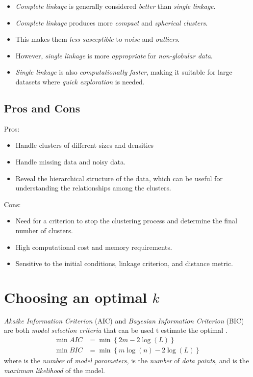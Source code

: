 \documentclass[
	number={6},
	title={Clustering}
]{cs584notes}
\begin{document}
\begin{itemize}
	\item \emph{Complete linkage} is generally considered \emph{better} than \emph{single linkage}.
	\item \emph{Complete linkage} produces more \emph{compact} and \emph{spherical clusters}.
	\item This makes them \emph{less susceptible} to \emph{noise} and \emph{outliers}.
	\item However, \emph{single linkage} is more \emph{appropriate} for \emph{non-globular data}.
	\item \emph{Single linkage} is also \emph{computationally faster}, making it suitable for large datasets where \emph{quick exploration} is needed.
\end{itemize}

\subsection{Pros and Cons}\label{subsec:pros-and-cons-3}
Pros:
\begin{itemize}
	\item Handle clusters of different sizes and densities
	\item Handle missing data and noisy data.
	\item Reveal the hierarchical structure of the data, which can be useful for understanding the relationships among the clusters.
\end{itemize}

Cons:
\begin{itemize}
	\item Need for a criterion to stop the clustering process and determine the final number of clusters.
	\item High computational cost and memory requirements.
	\item Sensitive to the initial conditions, linkage criterion, and distance metric.
\end{itemize}

\section{Choosing an optimal $k$}\label{sec:choosing-an-optimal-$k$}
\emph{Akaike Information Criterion} (AIC) and \emph{Bayesian Information Criterion} (BIC) are both \emph{model selection criteria} that can be used t estimate the optimal .
\begin{equation}
	\begin{aligned}
		\min AIC &= \min\left\{ 2m - 2\log(L) \right\}\\
		\min BIC &= \min\left\{ m\log(n) - 2\log(L) \right\}
	\end{aligned}\label{eq:aic-bic}
\end{equation}
where  is the \emph{number} of \emph{model parameters},  is the \emph{number} of \emph{data points}, and  is the \emph{maximum likelihood} of the model.
\end{document}
